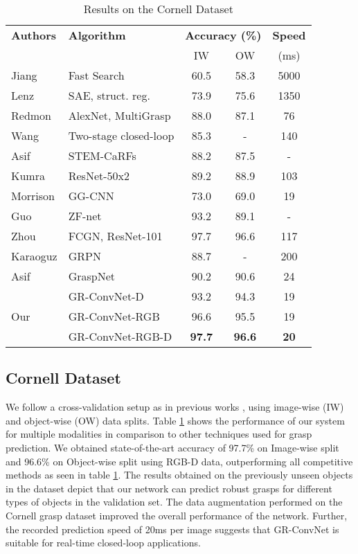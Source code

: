 \documentclass[letterpaper, 10 pt, conference]{ieeeconf}
\begin{document}
\begin{table}
\begin{center}
\vspace*{0.1cm}
\caption{Results on the Cornell Dataset}
\label{tab:cornell_results}
\begin{tabular}{l|l|cc|c}
\hline
\textbf{Authors} & \textbf{Algorithm} & \multicolumn{2}{|c|}{\textbf{Accuracy (\%)}} & \textbf{Speed} \\
& & IW & OW & (ms)\\
\hline
Jiang \cite{jiang2011efficient} & Fast Search & 60.5 & 58.3 & 5000 \\
Lenz \cite{lenz2015deep} & SAE, struct. reg. & 73.9 & 75.6 & 1350 \\
Redmon \cite{redmon2015real} & AlexNet, MultiGrasp & 88.0 & 87.1 & 76 \\
Wang \cite{wang2016robot} & Two-stage closed-loop & 85.3 & - & 140 \\
Asif \cite{asif2017rgb} & STEM-CaRFs & 88.2 & 87.5 & - \\
Kumra \cite{kumra2017robotic} & ResNet-50x2 & 89.2 & 88.9 & 103 \\
Morrison \cite{morrison2019learning} & GG-CNN & 73.0 & 69.0 & 19 \\
Guo \cite{guo2017hybrid} & ZF-net & 93.2 & 89.1 & - \\
Zhou \cite{zhou2018fully} & FCGN, ResNet-101 & 97.7 & 96.6 & 117 \\
Karaoguz \cite{karaoguz2019object} & GRPN & 88.7 & - & 200 \\
Asif \cite{asif2018graspnet} & GraspNet & 90.2 & 90.6 & 24 \\
\hline
 & GR-ConvNet-D & 93.2 & 94.3 & 19 \\
Our & GR-ConvNet-RGB & 96.6 & 95.5 & 19 \\
 & GR-ConvNet-RGB-D & \textbf{97.7} & \textbf{96.6} & \textbf{20} \\
\hline
\end{tabular}
\end{center}
\end{table}

\subsection{Cornell Dataset} \label{Cornell results}
We follow a cross-validation setup as in previous works \cite{lenz2015deep, redmon2015real, kumra2017robotic, asif2018graspnet, guo2017hybrid}, using image-wise (IW) and object-wise (OW) data splits. Table \ref{tab:cornell_results} shows the performance of our system for multiple modalities in comparison to other techniques used for grasp prediction. We obtained state-of-the-art accuracy of 97.7\% on Image-wise split and 96.6\% on Object-wise split using RGB-D data, outperforming all competitive methods as seen in table \ref{tab:cornell_results}. The results obtained on the previously unseen objects in the dataset depict that our network can predict robust grasps for different types of objects in the validation set. The data augmentation performed on the Cornell grasp dataset improved the overall performance of the network. Further, the recorded prediction speed of 20ms per image suggests that GR-ConvNet is suitable for real-time closed-loop applications.
\end{document}
